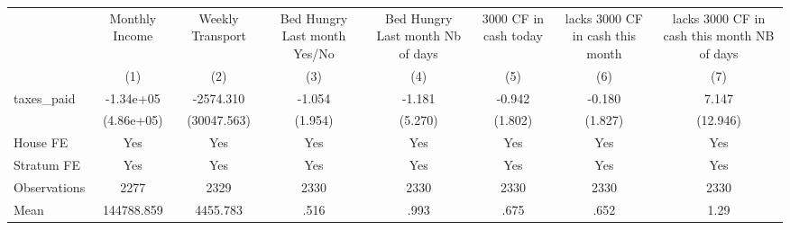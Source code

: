 {
\def\sym#1{\ifmmode^{#1}\else\(^{#1}\)\fi}
\begin{tabular}{l*{7}{c}}
\hline\hline
                &\multicolumn{1}{c}{Monthly Income}&\multicolumn{1}{c}{Weekly Transport}&\multicolumn{1}{c}{Bed Hungry Last month Yes/No}&\multicolumn{1}{c}{Bed Hungry Last month Nb of days}&\multicolumn{1}{c}{3000 CF in cash today}&\multicolumn{1}{c}{lacks 3000 CF in cash this month}&\multicolumn{1}{c}{lacks 3000 CF in cash this month NB of days}\\
                &\multicolumn{1}{c}{(1)}         &\multicolumn{1}{c}{(2)}         &\multicolumn{1}{c}{(3)}         &\multicolumn{1}{c}{(4)}         &\multicolumn{1}{c}{(5)}         &\multicolumn{1}{c}{(6)}         &\multicolumn{1}{c}{(7)}         \\
\hline
taxes\_paid      &-1.34e+05         &-2574.310         &   -1.054         &   -1.181         &   -0.942         &   -0.180         &    7.147         \\
                &(4.86e+05)         &(30047.563)         &  (1.954)         &  (5.270)         &  (1.802)         &  (1.827)         & (12.946)         \\
House FE        &      Yes         &      Yes         &      Yes         &      Yes         &      Yes         &      Yes         &      Yes         \\
Stratum FE      &      Yes         &      Yes         &      Yes         &      Yes         &      Yes         &      Yes         &      Yes         \\
\hline
Observations    &     2277         &     2329         &     2330         &     2330         &     2330         &     2330         &     2330         \\
Mean            &144788.859         & 4455.783         &     .516         &     .993         &     .675         &     .652         &     1.29         \\
\hline\hline
\end{tabular}
}
